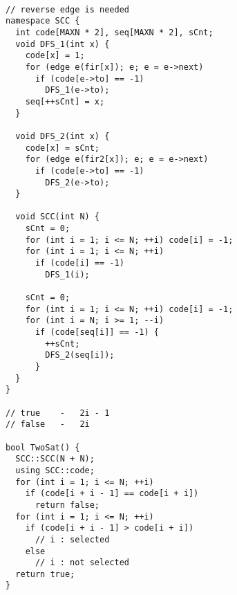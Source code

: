 \begin{lstlisting}

// reverse edge is needed
namespace SCC {
  int code[MAXN * 2], seq[MAXN * 2], sCnt;
  void DFS_1(int x) {
    code[x] = 1;
    for (edge e(fir[x]); e; e = e->next)
      if (code[e->to] == -1)
        DFS_1(e->to);
    seq[++sCnt] = x;
  }

  void DFS_2(int x) {
    code[x] = sCnt;
    for (edge e(fir2[x]); e; e = e->next)
      if (code[e->to] == -1)
        DFS_2(e->to);
  }

  void SCC(int N) {
    sCnt = 0;
    for (int i = 1; i <= N; ++i) code[i] = -1;
    for (int i = 1; i <= N; ++i)
      if (code[i] == -1)
        DFS_1(i);

    sCnt = 0;
    for (int i = 1; i <= N; ++i) code[i] = -1;
    for (int i = N; i >= 1; --i)
      if (code[seq[i]] == -1) {
        ++sCnt;
        DFS_2(seq[i]);
      }
  }
}

// true    -   2i - 1
// false   -   2i

bool TwoSat() {
  SCC::SCC(N + N);
  using SCC::code;
  for (int i = 1; i <= N; ++i)
    if (code[i + i - 1] == code[i + i])
      return false;
  for (int i = 1; i <= N; ++i)
    if (code[i + i - 1] > code[i + i])
      // i : selected
    else
      // i : not selected
  return true;
}

\end{lstlisting}